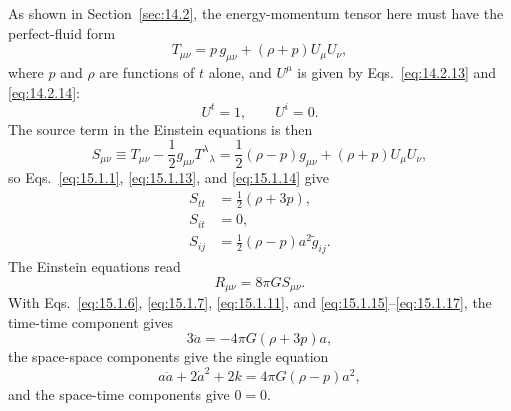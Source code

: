 As shown in Section~\ref{sec:14.2}, the energy-momentum tensor here must have
the perfect-fluid form
\begin{equation}
  T_{\mu\nu}
  =p\,g_{\mu\nu}+(\rho+p)U_\mu U_\nu,
  \tag{15.1.12}\label{eq:15.1.12}
\end{equation}
where \(p\) and \(\rho\) are functions of \(t\) alone, and \(U^\mu\) is
given by Eqs.~\eqref{eq:14.2.13} and \eqref{eq:14.2.14}:
\begin{equation}
  U^t=1,\qquad U^i=0.
  \tag{15.1.13}\label{eq:15.1.13}
\end{equation}
The source term in the Einstein equations is then
\begin{equation}
  S_{\mu\nu}
  \equiv T_{\mu\nu}-\frac12g_{\mu\nu}T^\lambda{}_\lambda
  =\frac12(\rho-p)g_{\mu\nu}+(\rho+p)U_\mu U_\nu,
  \tag{15.1.14}\label{eq:15.1.14}
\end{equation}
so Eqs.~\eqref{eq:15.1.1}, \eqref{eq:15.1.13}, and
\eqref{eq:15.1.14} give
\begin{align}
  S_{tt}
  &=\frac12(\rho+3p),
  \tag{15.1.15}\label{eq:15.1.15}\\
  S_{it}
  &=0,
  \tag{15.1.16}\label{eq:15.1.16}\\
  S_{ij}
  &=\frac12(\rho-p)a^2\widetilde g_{ij}.
  \tag{15.1.17}\label{eq:15.1.17}
\end{align}
The Einstein equations read
\[
  R_{\mu\nu}=8\pi G S_{\mu\nu}.
\]
With Eqs.~\eqref{eq:15.1.6}, \eqref{eq:15.1.7},
\eqref{eq:15.1.11}, and \eqref{eq:15.1.15}--\eqref{eq:15.1.17}, the
time-time component gives
\begin{equation}
  3\ddot a=-4\pi G(\rho+3p)a,
  \tag{15.1.18}\label{eq:15.1.18}
\end{equation}
the space-space components give the single equation
\begin{equation}
  a\ddot a+2\dot a^2+2k
  =4\pi G(\rho-p)a^2,
  \tag{15.1.19}\label{eq:15.1.19}
\end{equation}
and the space-time components give \(0=0\).

